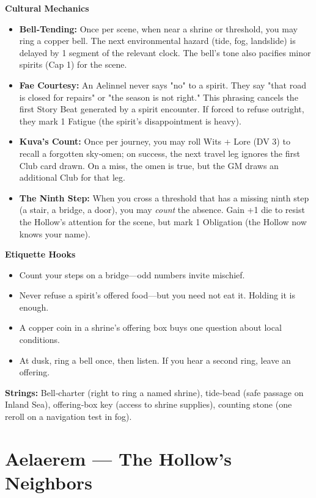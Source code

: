 \documentclass[12pt]{book}
\begin{document}
\begin{infobox}
\textbf{Cultural Mechanics}
\begin{itemize}
    \item \textbf{Bell‑Tending:} Once per scene, when near a shrine or threshold, you may ring a copper bell. The next environmental hazard (tide, fog, landslide) is delayed by 1 segment of the relevant clock. The bell's tone also pacifies minor spirits (Cap 1) for the scene.
    \item \textbf{Fae Courtesy:} An Aelinnel never says "no" to a spirit. They say "that road is closed for repairs" or "the season is not right." This phrasing cancels the first Story Beat generated by a spirit encounter. If forced to refuse outright, they mark 1 Fatigue (the spirit's disappointment is heavy).
    \item \textbf{Kuva's Count:} Once per journey, you may roll Wits + Lore (DV 3) to recall a forgotten sky‑omen; on success, the next travel leg ignores the first Club card drawn. On a miss, the omen is true, but the GM draws an additional Club for that leg.
    \item \textbf{The Ninth Step:} When you cross a threshold that has a missing ninth step (a stair, a bridge, a door), you may \textit{count} the absence. Gain +1 die to resist the Hollow's attention for the scene, but mark 1 Obligation (the Hollow now knows your name).
\end{itemize}
\textbf{Etiquette Hooks}
\begin{itemize}
    \item Count your steps on a bridge---odd numbers invite mischief.
    \item Never refuse a spirit's offered food---but you need not eat it. Holding it is enough.
    \item A copper coin in a shrine's offering box buys one question about local conditions.
    \item At dusk, ring a bell once, then listen. If you hear a second ring, leave an offering.
\end{itemize}
\textbf{Strings:} Bell‑charter (right to ring a named shrine), tide‑bead (safe passage on Inland Sea), offering‑box key (access to shrine supplies), counting stone (one reroll on a navigation test in fog).
\end{infobox}

\section{Aelaerem --- The Hollow's Neighbors}
\end{document}

